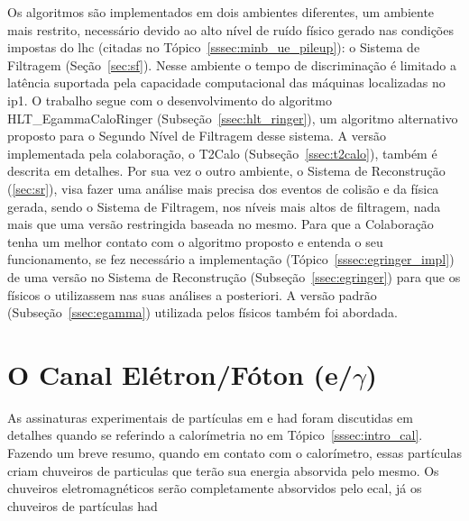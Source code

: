 Os algoritmos são implementados em dois ambientes diferentes, um ambiente mais
restrito, necessário devido ao alto nível de ruído físico gerado nas condições 
impostas do \gls{lhc} (citadas no Tópico~\ref{sssec:minb_ue_pileup}): o Sistema de 
Filtragem (Seção~\ref{sec:sf}). Nesse ambiente o tempo de discriminação 
é limitado a latência suportada pela capacidade computacional das máquinas localizadas 
no \gls{ip}1. O trabalho segue com o desenvolvimento do algoritmo HLT\_EgammaCaloRinger 
(Subseção~\ref{ssec:hlt_ringer}), um algoritmo alternativo proposto para o
Segundo Nível de Filtragem desse sistema. A versão implementada pela colaboração, o T2Calo (Subseção~\ref{ssec:t2calo}), 
também é descrita em detalhes. Por sua vez o outro ambiente, o Sistema de Reconstrução
(\ref{sec:sr}), visa fazer uma análise mais precisa dos eventos de colisão e da 
física gerada, sendo o Sistema de Filtragem, nos níveis mais altos de filtragem, 
nada mais que uma versão restringida baseada no mesmo. Para que a Colaboração tenha 
um melhor contato com o algoritmo proposto e entenda o seu funcionamento, se fez
necessário a implementação (Tópico~\ref{sssec:egringer_impl}) de uma versão no Sistema 
de Reconstrução (Subseção~\ref{ssec:egringer}) para que os físicos o utilizassem nas suas 
análises a posteriori. A versão padrão (Subseção~\ref{ssec:egamma}) utilizada
pelos físicos também foi abordada.


\section{\texorpdfstring{O Canal Elétron/Fóton (e/$\gamma$)}{O Canal
Elétron/Fóton (Egamma)}}
\label{sec:egamma}

As assinaturas experimentais de partículas \gls{em} e \gls{had} foram 
discutidas em detalhes quando se referindo a calorímetria no \gls{em}
Tópico~\ref{sssec:intro_cal}. Fazendo um breve resumo, quando em contato com o
calorímetro, essas partículas criam chuveiros de particulas que terão sua energia 
absorvida pelo mesmo. Os chuveiros eletromagnéticos serão completamente absorvidos pelo
\gls{ecal}, já os chuveiros de partículas \gls{had}





